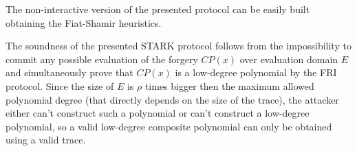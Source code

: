 \documentclass[../lecture-notes.tex]{subfiles}
\begin{document}
The non-interactive version of the presented protocol can be easily built obtaining the Fiat-Shamir heuristics.

The soundness of the presented STARK protocol follows from the impossibility to commit any possible evaluation of the forgery $CP(x)$ over evaluation domain $E$ and simultaneously prove that $CP(x)$ is a low-degree polynomial by the FRI protocol. Since the size of $E$ is $\rho$ times bigger then the maximum allowed polynomial degree (that directly depends on the size of the trace), the attacker either can't construct such a polynomial or can't construct a low-degree polynomial, so a valid low-degree composite polynomial can only be obtained using a valid trace.
\end{document}
